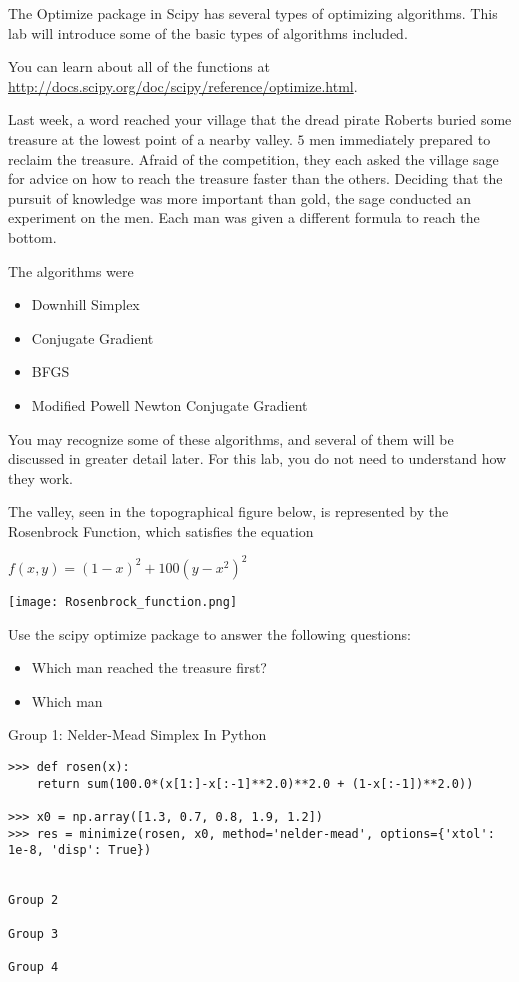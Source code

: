 \label{lab:Optimization 1}

The Optimize package in Scipy has several types of optimizing algorithms. This lab will introduce some of the basic types of algorithms included.

You can learn about all of the functions at \url{http://docs.scipy.org/doc/scipy/reference/optimize.html}.


Last week, a word reached your village that the dread pirate Roberts buried some treasure at the lowest point of a nearby valley. $5$ men immediately prepared to reclaim the treasure. Afraid of the competition, they each asked the village sage for advice on how to reach the treasure faster than the others. Deciding that the pursuit of knowledge was more important than gold, the sage conducted an experiment on the men. Each man was given a different formula to reach the bottom.  

The algorithms were 
\begin{itemize}
\item Downhill Simplex
\item Conjugate Gradient
\item BFGS
\item Modified Powell
\itme Newton Conjugate Gradient
\end{itemize}

You may recognize some of these algorithms, and several of them will be discussed in greater detail later. For this lab, you do not need to understand how they work.


The valley, seen in the topographical figure below, is represented by the Rosenbrock Function, 
which satisfies the equation

\begin{center}
$f(x,y) = (1-x)^2 + 100(y-x^2)^2$
\end{center}

 
\texttt{[image: Rosenbrock\_function.png]}


Use the scipy optimize package to answer the following questions:
\begin{itemize}
\item Which man reached the treasure first?
\item Which man 
\end{itemize}

Group 1: Nelder-Mead Simplex
In Python

\begin{lstlisting}[style=python]
>>> def rosen(x):
	return sum(100.0*(x[1:]-x[:-1]**2.0)**2.0 + (1-x[:-1])**2.0))

>>> x0 = np.array([1.3, 0.7, 0.8, 1.9, 1.2])
>>> res = minimize(rosen, x0, method='nelder-mead', options={'xtol': 1e-8, 'disp': True})


Group 2

Group 3

Group 4
\end{lstlisting}
